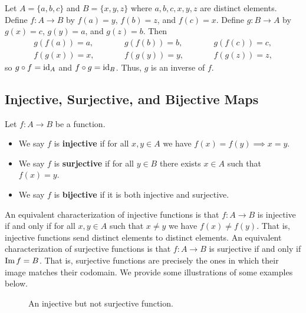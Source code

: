 \begin{example}[Inverse]
	Let $A = \{a, b, c\}$ and $B = \{x, y, z\}$ where $a, b, c, x, y, z$ are distinct elements.
	Define $f:A\rightarrow B$ by $f(a) = y$, $f(b) = z$, and $f(c) = x$.
	Define $g:B\rightarrow A$ by $g(x) = c$, $g(y) = a$, and $g(z) = b$.
	Then
	\begin{align*}
		g(f(a)) = a, &\qquad& g(f(b)) = b, &\qquad& g(f(c)) = c, \\
		f(g(x)) = x, &\qquad& f(g(y)) = y, &\qquad& f(g(z)) = z,
	\end{align*}
	so $g\circ f = \operatorname{id}_A$ and $f\circ g = \operatorname{id}_B$.
	Thus, $g$ is an inverse of $f$.
\end{example}

\subsection{Injective, Surjective, and Bijective Maps}

\begin{definition}
	Let $f:A\rightarrow B$ be a function.
	\begin{itemize}[itemsep=-0.4ex]
		\item We say $f$ is \textbf{injective} if for all $x, y\in A$ we have $f(x) = f(y)\implies x = y$.
		\item We say $f$ is \textbf{surjective} if for all $y\in B$ there exists $x\in A$ such that $f(x) = y$.
		\item We say $f$ is \textbf{bijective} if it is both injective and surjective. 
	\end{itemize}
\end{definition}

An equivalent characterization of injective functions is that $f:A\rightarrow B$ is injective if and only if for all $x, y\in A$ such that $x\ne y$ we have $f(x) \ne f(y)$.
That is, injective functions send distinct elements to distinct elements. 
An equivalent characterization of surjective functions is that $f:A\rightarrow B$ is surjective if and only if $\operatorname{Im} f = B$. 
That is, surjective functions are precisely the ones in which their image matches their codomain. 
We provide some illustrations of some examples below. 

\begin{figure}[H]
	\centering
	\caption{An injective but not surjective function.}
\end{figure}

